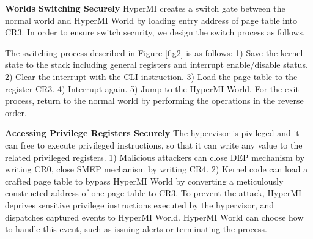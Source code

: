 \documentclass[conference]{IEEEtran}
\begin{document}
\textbf{Worlds Switching Securely}
HyperMI creates a switch gate between the normal world and HyperMI World by loading entry address of page table into CR3.
In order to ensure switch security, we design the switch process as follows.

The switching process described in Figure \ref{fig2} is as follows: 1) Save the kernel state to the stack including general registers and interrupt enable/disable status. 2) Clear the interrupt with the CLI instruction. 3) Load the page table to the register CR3. 4) Interrupt again. 5) Jump to the HyperMI World. For the exit process, return to the normal world by performing the operations in the reverse order.

\textbf{Accessing Privilege Registers Securely}
The hypervisor is pivileged and it can free to execute privileged instructions, so that it can write any value to the related privileged registers. 1) Malicious attackers can close DEP mechanism by writing CR0, close SMEP mechanism by writing CR4. 2) Kernel code can load a crafted page table to bypass HyperMI World by converting a meticulously constructed address of one page table to CR3.
To prevent the attack, HyperMI deprives sensitive privilege instructions executed by the hypervisor, and dispatches captured events to HyperMI World. HyperMI World can choose how to handle this event, such as issuing alerts or terminating the process. 
\end{document}
